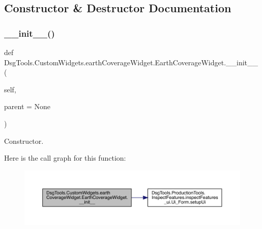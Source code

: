 \subsection{Constructor \& Destructor Documentation}
\mbox{\label{class_dsg_tools_1_1_custom_widgets_1_1earth_coverage_widget_1_1_earth_coverage_widget_a51fc49d4a0bd276824ae6f609376043a}} 
\subsubsection{\texorpdfstring{\+\_\+\+\_\+init\+\_\+\+\_\+()}{\_\_init\_\_()}}
{\footnotesize\ttfamily def Dsg\+Tools.\+Custom\+Widgets.\+earth\+Coverage\+Widget.\+Earth\+Coverage\+Widget.\+\_\+\+\_\+init\+\_\+\+\_\+ (\begin{DoxyParamCaption}\item[{}]{self,  }\item[{}]{parent = {\ttfamily None} }\end{DoxyParamCaption})}

\begin{DoxyVerb}Constructor.\end{DoxyVerb}
 Here is the call graph for this function\+:
\nopagebreak
\begin{figure}[H]
\begin{center}
\leavevmode
\includegraphics[width=350pt]{class_dsg_tools_1_1_custom_widgets_1_1earth_coverage_widget_1_1_earth_coverage_widget_a51fc49d4a0bd276824ae6f609376043a_cgraph}
\end{center}
\end{figure}


